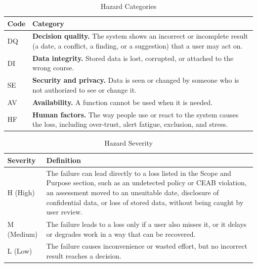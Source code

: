 \documentclass{article}
\begin{document}
\begin{table}[H]
\centering
\small
\renewcommand{\arraystretch}{1.2}
\caption{Hazard Categories}
\label{TblHazardCategories}
\begin{tabular}{>{\raggedright\arraybackslash}p{}
  >{\raggedright\arraybackslash}p{}}
\toprule
\textbf{Code} & \textbf{Category}\\
\midrule
DQ & \textbf{Decision quality.} The system shows an incorrect or incomplete
  result (a date, a conflict, a finding, or a suggestion) that a user may act
  on.\\
DI & \textbf{Data integrity.} Stored data is lost, corrupted, or attached to
  the wrong course.\\
SE & \textbf{Security and privacy.} Data is seen or changed by someone who is
  not authorized to see or change it.\\
AV & \textbf{Availability.} A function cannot be used when it is needed.\\
HF & \textbf{Human factors.} The way people use or react to the system causes
  the loss, including over-trust, alert fatigue, exclusion, and stress.\\
\bottomrule
\end{tabular}
\end{table}

\begin{table}[H]
\centering
\small
\renewcommand{\arraystretch}{1.2}
\caption{Hazard Severity}
\label{TblHazardSeverity}
\begin{tabular}{>{\raggedright\arraybackslash}p{}
  >{\raggedright\arraybackslash}p{}}
\toprule
\textbf{Severity} & \textbf{Definition}\\
\midrule
H (High) & The failure can lead directly to a loss listed in the Scope and
  Purpose section, such as an undetected policy or CEAB violation, an
  assessment moved to an unsuitable date, disclosure of confidential data, or
  loss of stored data, without being caught by user review.\\
M (Medium) & The failure leads to a loss only if a user also misses it, or it
  delays or degrades work in a way that can be recovered.\\
L (Low) & The failure causes inconvenience or wasted effort, but no incorrect
  result reaches a decision.\\
\bottomrule
\end{tabular}
\end{table}
\end{document}
